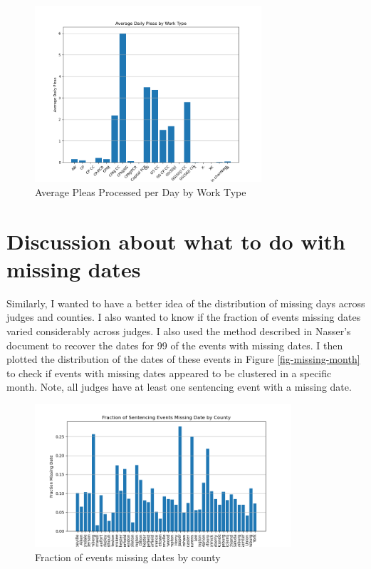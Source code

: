 \documentclass[11pt]{article}
\begin{document}
  \begin{figure}[H]
    \centering
    \includegraphics[width=0.75\textwidth]{../../../output/figures/Exploration/avg_pleas_by_worktype.png}
    \caption{Average Pleas Processed per Day by Work Type}
    \label{fig-avg-plea}
  \end{figure}

\section{Discussion about what to do with missing dates}
  Similarly, I wanted to have a better idea of the distribution of missing days across judges and counties. I also wanted to know if the fraction of events missing dates varied considerably across judges. I also used the method described in Nasser's document to recover the dates for 99 of the events with missing dates. I then plotted the distribution of the dates of these events in Figure \ref{fig-missing-month} to check if events with missing dates appeared to be clustered in a specific month. Note, all judges have at least one sentencing event with a missing date.

  \begin{figure}[H]
    \centering
    \includegraphics[width=0.85\textwidth]{../../../output/figures/Exploration/fraction_missing_date_by_County.png}
    \caption{Fraction of events missing dates by county}
    \label{fig-frac-missing-county}
  \end{figure}
\end{document}
